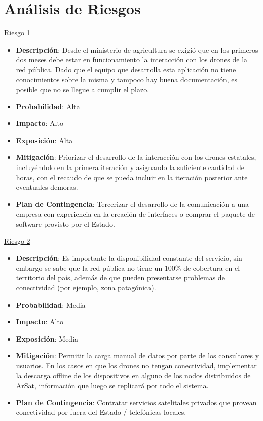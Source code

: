 \section{Análisis de Riesgos}

\underline{Riesgo 1}

\begin{itemize} \itemsep -2pt
    \item \textbf{Descripción}: Desde el ministerio de agricultura se exigió que en los primeros dos meses debe estar en funcionamiento la interacción con los drones de la red pública. Dado que el equipo que desarrolla esta aplicación no tiene conocimientos sobre la misma y tampoco hay buena documentación, es posible que no se llegue a cumplir el plazo.
    \item \textbf{Probabilidad}: Alta
    \item \textbf{Impacto}: Alto
    \item \textbf{Exposición}: Alta
    \item \textbf{Mitigación}: Priorizar el desarrollo de la interacción con los drones estatales, incluyéndolo en la primera iteración y asignando la suficiente cantidad de horas, con el recaudo de que se pueda incluir en la iteración posterior ante eventuales demoras.
    \item \textbf{Plan de Contingencia}: Tercerizar el desarrollo de la comunicación a una empresa con experiencia en la creación de interfaces o comprar el paquete de software provisto por el Estado.
\end{itemize}
 
\underline{Riesgo 2} 

\begin{itemize} \itemsep -2pt
    \item \textbf{Descripción}: Es importante la disponibilidad constante del servicio, sin embargo se sabe que la red pública no tiene un 100\% de cobertura en el territorio del país, además de que pueden presentarse problemas de conectividad (por ejemplo, zona patagónica).
    \item \textbf{Probabilidad}: Media
    \item \textbf{Impacto}: Alto
    \item \textbf{Exposición}: Media
    \item \textbf{Mitigación}: Permitir la carga manual de datos por parte de los consultores y usuarios. En los casos en que los drones no tengan conectividad, implementar la descarga offline de los dispositivos en alguno de los nodos distribuidos de ArSat, información que luego se replicará por todo el sistema.
    \item \textbf{Plan de Contingencia}: Contratar servicios satelitales privados que provean conectividad por fuera del Estado / telefónicas locales.
\end{itemize}


